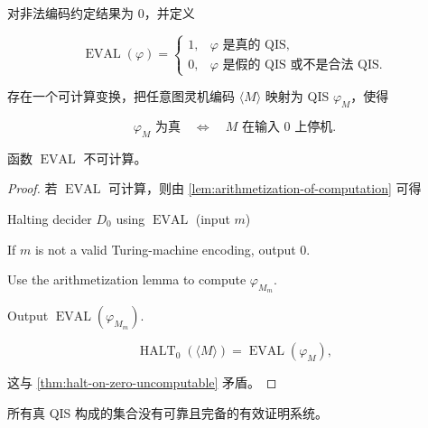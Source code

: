 对非法编码约定结果为 $0$，并定义

\[
  \operatorname{EVAL}(\varphi)=
  \begin{cases}
    1,&\varphi\text{ 是真的 QIS},\\
    0,&\varphi\text{ 是假的 QIS 或不是合法 QIS}.
  \end{cases}
\]

\begin{lemma}[计算历史的算术化]
  \label{lem:arithmetization-of-computation}
  存在一个可计算变换，把任意图灵机编码 $\langle M\rangle$ 映射为 QIS
  $\varphi_M$，使得

  \[
    \varphi_M\text{ 为真}
    \quad\Longleftrightarrow\quad
    M\text{ 在输入 }0\text{ 上停机}.
  \]
\end{lemma}

\begin{theorem}
  \label{thm:qis-evaluation-uncomputable}
  函数 $\operatorname{EVAL}$ 不可计算。
\end{theorem}

\begin{proof}
  若 $\operatorname{EVAL}$ 可计算，则由
  \cref{lem:arithmetization-of-computation} 可得

  \begin{pseudocode}{Halting decider $D_0$ using $\operatorname{EVAL}$
      (input $m$)}
    \item If $m$ is not a valid Turing-machine encoding, output $0$.
    \item Use the arithmetization lemma to compute $\varphi_{M_m}$.
    \item Output $\operatorname{EVAL}(\varphi_{M_m})$.
  \end{pseudocode}

  \[
    \operatorname{HALT}_0(\langle M\rangle)
      =\operatorname{EVAL}(\varphi_M),
  \]

  这与 \cref{thm:halt-on-zero-uncomputable} 矛盾。
\end{proof}

\begin{theorem}[量化整数真理的不完备性]
  \label{thm:qis-incompleteness}
  所有真 QIS 构成的集合没有可靠且完备的有效证明系统。
\end{theorem}

